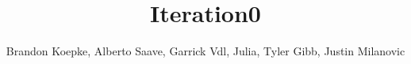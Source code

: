\title{Iteration0}

\author{Brandon Koepke, Alberto Saave, Garrick Vdl, Julia, Tyler Gibb, Justin Milanovic}

\maketitle
